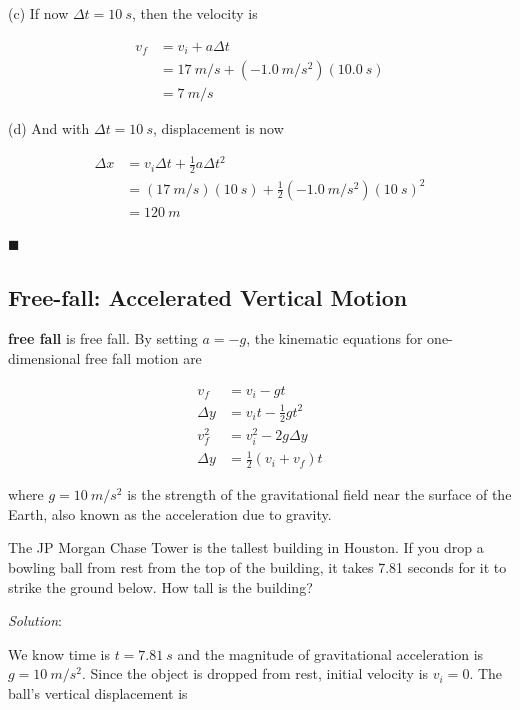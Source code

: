 \documentclass[dvipsnames]{article}
\begin{document}
(c) If now $\Delta t = \SI{10}{s}$, then the velocity is

\begin{align*}
    v_f &= v_i + a \Delta t \\[1ex]
    &= \SI{17}{m/s} + \left(\SI{-1.0}{m/s^2}\right)(\SI{10.0}{s}) \\[1ex]
    &= \boxed{\SI{7}{m/s}}
\end{align*}

(d) And with $\Delta t = \SI{10}{s}$, displacement is now

\begin{align*}
    \Delta x &= v_i \Delta t + \frac{1}{2}a \Delta t^2 \\[1ex]
    &= (\SI{17}{m/s}) (\SI{10}{s}) + \frac{1}{2} \left(\SI{-1.0}{m/s^2}\right)(\SI{10}{s})^2 \\[1ex]
    &= \boxed{\SI{120}{m}}
\end{align*}

\hfill $\blacksquare$

\subsection{Free-fall: Accelerated Vertical Motion}

\textbf{\Gls{free fall}} is \glsdesc{free fall}. By setting $a = -g$, the kinematic equations for one-dimensional free fall motion are

\begin{align}
    v_f &= v_i - gt \label{xgXRE} \\[1ex]
    \Delta y &= v_i t - \frac{1}{2}gt^2 \\[1ex]
    v_f^2 &= v_i^2 - 2g\Delta y \\[1ex]
    \Delta y &= \frac{1}{2}\left(v_i + v_f\right) t
\end{align}

where $g = \SI{10}{m/s^2}$ is the strength of the gravitational field near the surface of the Earth, also known as the acceleration due to gravity.


\begin{example}
    The JP Morgan Chase Tower is the tallest building in Houston. If you drop a bowling ball from rest from the top of the building, it takes 7.81 seconds for it to strike the ground below. How tall is the building?
\end{example}

\textit{Solution}:

We know time is $t = \SI{7.81}{s}$ and the magnitude of gravitational acceleration is $g = \SI{10}{m/s^2}$. Since the object is dropped from rest, initial velocity is $v_i = 0$. The ball's vertical displacement is
\end{document}
